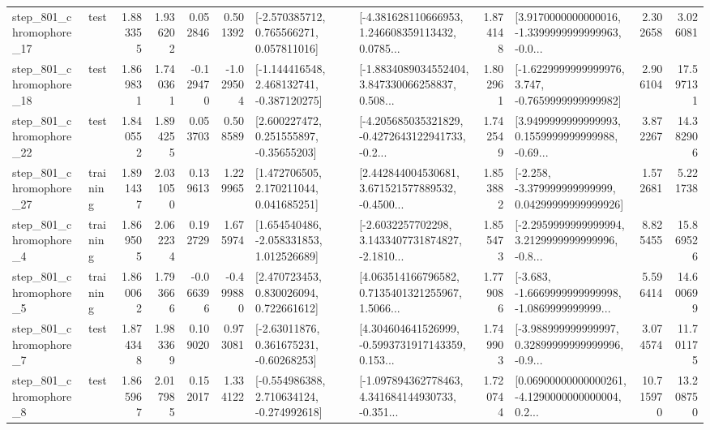 \begin{tabular}{llrrrrllrlrr}
  step\_801\_chromophore\_17 &      test &      1.883355 &    1.936202 &      0.052846 &  0.501392 &    [-2.570385712, 0.765566271, 0.057811016] &  [-4.381628110666953, 1.246608359113432, 0.0785... &       1.874148 &  [3.9170000000000016, -1.3399999999999963, -0.0... &            2.302658 &          3.026081 \\
  step\_801\_chromophore\_18 &      test &      1.869831 &    1.740361 &     -0.129470 & -1.029504 &   [-1.144416548, 2.468132741, -0.387120275] &  [-1.8834089034552404, 3.847330066258837, 0.508... &       1.802961 &  [-1.6229999999999976, 3.747, -0.7659999999999982] &            2.906104 &         17.597131 \\
  step\_801\_chromophore\_22 &      test &      1.840552 &    1.894255 &      0.053703 &  0.508589 &     [2.600227472, 0.251555897, -0.35655203] &  [-4.205685035321829, -0.4272643122941733, -0.2... &       1.742549 &  [3.9499999999999993, 0.1559999999999988, -0.69... &            3.872267 &         14.382906 \\
  step\_801\_chromophore\_27 &  training &      1.891437 &    2.031050 &      0.139613 &  1.229965 &     [1.472706505, 2.170211044, 0.041685251] &  [2.442844004530681, 3.671521577889532, -0.4500... &       1.853882 &  [-2.258, -3.379999999999999, 0.04299999999999926] &            1.572681 &          5.221738 \\
   step\_801\_chromophore\_4 &  training &      1.869505 &    2.062234 &      0.192729 &  1.675974 &    [1.654540486, -2.058331853, 1.012526689] &  [-2.6032257702298, 3.1433407731874827, -2.1810... &       1.855473 &  [-2.2959999999999994, 3.2129999999999996, -0.8... &            8.825455 &         15.869526 \\
   step\_801\_chromophore\_5 &  training &      1.860062 &    1.793666 &     -0.066396 & -0.499880 &     [2.470723453, 0.830026094, 0.722661612] &  [4.063514166796582, 0.7135401321255967, 1.5066... &       1.779086 &  [-3.683, -1.6669999999999998, -1.0869999999999... &            5.596414 &         14.600699 \\
   step\_801\_chromophore\_7 &      test &      1.874348 &    1.983369 &      0.109020 &  0.973081 &     [-2.63011876, 0.361675231, -0.60268253] &  [4.304604641526999, -0.5993731917143359, 0.153... &       1.749903 &  [-3.988999999999997, 0.32899999999999996, -0.9... &            3.074574 &         11.701175 \\
   step\_801\_chromophore\_8 &      test &      1.865967 &    2.017985 &      0.152017 &  1.334122 &   [-0.554986388, 2.710634124, -0.274992618] &  [-1.097894362778463, 4.341684144930733, -0.351... &       1.720744 &  [0.06900000000000261, -4.1290000000000004, 0.2... &           10.715970 &         13.208750 \\

\end{tabular}
